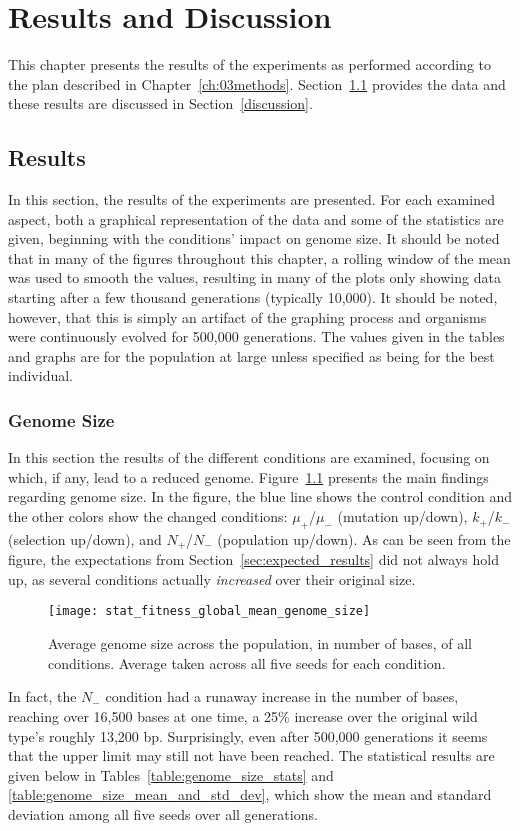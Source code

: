 \chapter{Results and Discussion}\label{ch:04results_discussion}
This chapter presents the results of the experiments as performed according to the plan described in Chapter~\ref{ch:03methods}. Section~\ref{results} provides the data and these results are discussed in Section~\ref{discussion}. 

\section{Results}\label{results}
In this section, the results of the experiments are presented. For each examined aspect, both a graphical representation of the data and some of the statistics are given, beginning with the conditions' impact on genome size. It should be noted that in many of the figures throughout this chapter, a rolling window of the mean was used to smooth the values, resulting in many of the plots only showing data starting after a few thousand generations (typically 10,000). It should be noted, however, that this is simply an artifact of the graphing process and organisms were continuously evolved for 500,000 generations. The values given in the tables and graphs are for the population at large unless specified as being for the best individual. 

\subsection{Genome Size}\label{sec:genome_size}

In this section the results of the different conditions are examined, focusing on which, if any, lead to a reduced genome. Figure~\ref{fig:genome_size} presents the main findings regarding genome size. In the figure, the blue line shows the control condition and the other colors show the changed conditions: $\mu_+$/$\mu_-$ (mutation up/down), $k_+$/$k_-$ (selection up/down), and $N_+$/$N_-$ (population up/down). As can be seen from the figure, the expectations from Section~\ref{sec:expected_results} did not always hold up, as several conditions actually \textit{increased} over their original size. 
\begin{figure}[H]
	\texttt{[image: stat\_fitness\_global\_mean\_genome\_size]}
	\centering
	\caption[Genome size]{Average genome size across the population, in number of bases, of all conditions. Average taken across all five seeds for each condition.}
	\label{fig:genome_size}
\end{figure}
In fact, the $N_-$ condition had a runaway increase in the number of bases, reaching over 16,500 bases at one time, a 25\% increase over the original wild type's roughly 13,200 bp. Surprisingly, even after 500,000 generations it seems that the upper limit may still not have been reached. The statistical results are given below in Tables~\ref{table:genome_size_stats} and \ref{table:genome_size_mean_and_std_dev}, which show the mean and standard deviation among all five seeds over all generations.

